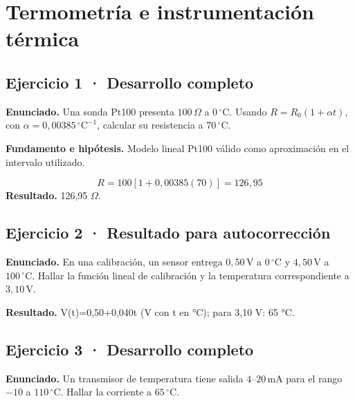 \documentclass[11pt,a4paper]{article}
\begin{document}
\section{Termometría e instrumentación térmica}

\begin{center}\end{center}

\subsection*{Ejercicio 1 · Desarrollo completo}
\textbf{Enunciado.} Una sonda Pt100 presenta \(100\,\Omega\) a \(0\,^\circ\mathrm C\). Usando \(R=R_0(1+\alpha t)\), con \(\alpha=0{,}00385\,^\circ\mathrm C^{-1}\), calcular su resistencia a \(70\,^\circ\mathrm C\).

\textbf{Fundamento e hipótesis.} Modelo lineal Pt100 válido como aproximación en el intervalo utilizado.

\[
R=100[1+0{,}00385(70)]=126{,}95
\]
\textbf{Resultado.} 126,95 \ensuremath{\Omega}.


\subsection*{Ejercicio 2 · Resultado para autocorrección}
\textbf{Enunciado.} En una calibración, un sensor entrega \(0{,}50\,\mathrm V\) a \(0\,^\circ\mathrm C\) y \(4{,}50\,\mathrm V\) a \(100\,^\circ\mathrm C\). Hallar la función lineal de calibración y la temperatura correspondiente a \(3{,}10\,\mathrm V\).

\textbf{Resultado.} V(t)=0,50+0,040t (V con t en °C); para 3,10 V: 65 °C.


\subsection*{Ejercicio 3 · Desarrollo completo}
\textbf{Enunciado.} Un transmisor de temperatura tiene salida \(4\)--\(20\,\mathrm{mA}\) para el rango \(-10\) a \(110\,^\circ\mathrm C\). Hallar la corriente a \(65\,^\circ\mathrm C\).
\end{document}
